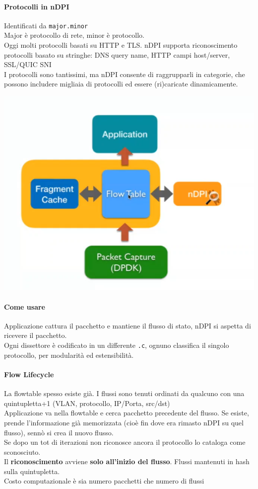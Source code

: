 \documentclass[10pt]{book}
\begin{document}
\paragraph{Protocolli in nDPI} Identificati da \texttt{major.minor}\\
Major è protocollo di rete, minor è protocollo.\\
Oggi molti protocolli basati su HTTP e TLS. nDPI supporta riconoscimento protocolli basato su stringhe: DNS query name, HTTP campi host/server, SSL/QUIC SNI\\
I protocolli sono tantissimi, ma nDPI consente di raggrupparli in categorie, che possono includere migliaia di protocolli ed essere (ri)caricate dinamicamente.
\begin{center}
	\includegraphics[scale=0.5]{ndpiarch.png}
\end{center}
\paragraph{Come usare} Applicazione cattura il pacchetto e mantiene il flusso di stato, nDPI si aspetta di ricevere il pacchetto.\\
Ogni dissettore è codificato in un differente \texttt{.c}, ognuno classifica il singolo protocollo, per modularità ed estensibilità.
\paragraph{Flow Lifecycle} La flowtable spesso esiste già. I flussi sono tenuti ordinati da qualcuno con una quintupletta+1 (VLAN, protocollo, IP/Porta, src/dst)\\
Applicazione va nella flowtable e cerca pacchetto precedente del flusso. Se esiste, prende l'informazione già memorizzata (cioè fin dove era rimasto nDPI su quel flusso), sennò si crea il nuovo flusso.\\
Se dopo un tot di iterazioni non riconosce ancora il protocollo lo cataloga come sconosciuto.\\
Il \textbf{riconoscimento} avviene \textbf{solo all'inizio del flusso}. Flussi mantenuti in hash sulla quintupletta.\\
Costo computazionale è sia numero pacchetti che numero di flussi
\end{document}
